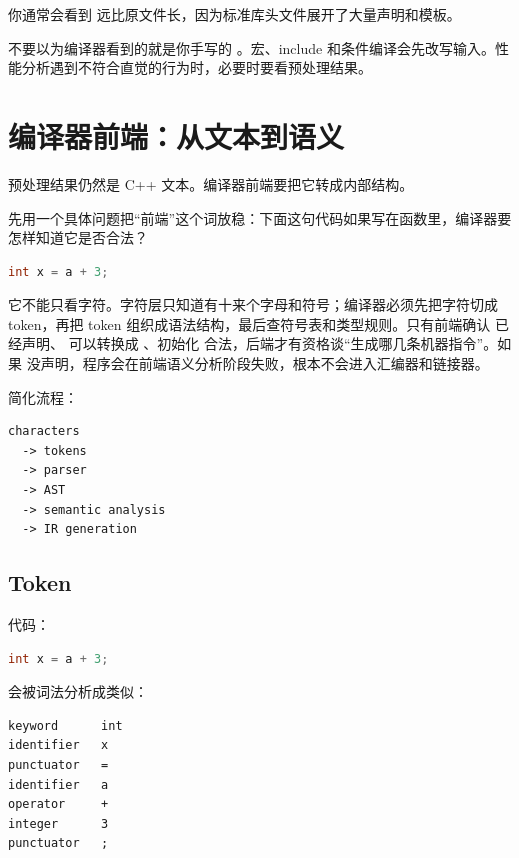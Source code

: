 你通常会看到  远比原文件长，因为标准库头文件展开了大量声明和模板。

\begin{warningbox}
不要以为编译器看到的就是你手写的 。宏、include 和条件编译会先改写输入。性能分析遇到不符合直觉的行为时，必要时要看预处理结果。
\end{warningbox}

\section{编译器前端：从文本到语义}

预处理结果仍然是 C++ 文本。编译器前端要把它转成内部结构。

先用一个具体问题把“前端”这个词放稳：下面这句代码如果写在函数里，编译器要怎样知道它是否合法？

\begin{lstlisting}[language=C++]
int x = a + 3;
\end{lstlisting}

它不能只看字符。字符层只知道有十来个字母和符号；编译器必须先把字符切成 token，再把 token 组织成语法结构，最后查符号表和类型规则。只有前端确认  已经声明、 可以转换成 、初始化  合法，后端才有资格谈“生成哪几条机器指令”。如果  没声明，程序会在前端语义分析阶段失败，根本不会进入汇编器和链接器。

简化流程：

\begin{center}
\begin{minipage}{0.78\linewidth}
\begin{verbatim}
characters
  -> tokens
  -> parser
  -> AST
  -> semantic analysis
  -> IR generation
\end{verbatim}
\end{minipage}
\end{center}

\subsection{Token}

代码：

\begin{lstlisting}[language=C++]
int x = a + 3;
\end{lstlisting}

会被词法分析成类似：

\begin{center}
\begin{verbatim}
keyword      int
identifier   x
punctuator   =
identifier   a
operator     +
integer      3
punctuator   ;
\end{verbatim}
\end{center}

